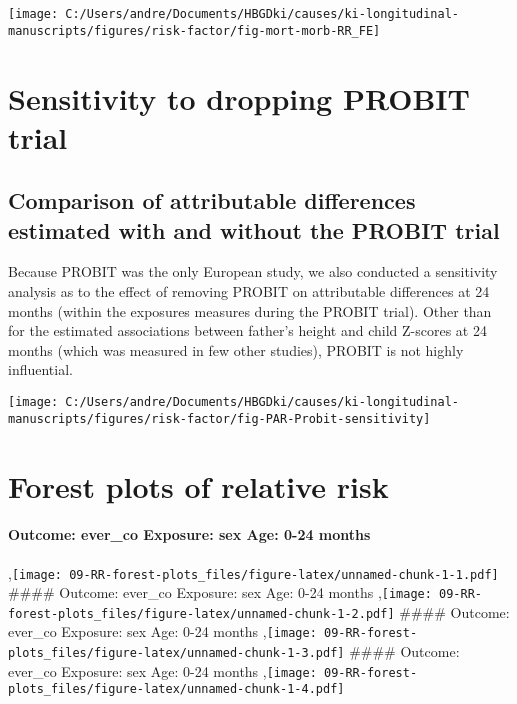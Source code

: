 \documentclass[
  9pt,
]{book}
\begin{document}
\texttt{[image: C:/Users/andre/Documents/HBGDki/causes/ki-longitudinal-manuscripts/figures/risk-factor/fig-mort-morb-RR\_FE]}

\hypertarget{no-PROBIT}{%
\chapter{Sensitivity to dropping PROBIT trial}\label{no-PROBIT}}

\raggedright

\hypertarget{comparison-of-attributable-differences-estimated-with-and-without-the-probit-trial}{%
\section{Comparison of attributable differences estimated with and without the PROBIT trial}\label{comparison-of-attributable-differences-estimated-with-and-without-the-probit-trial}}

Because PROBIT was the only European study, we also conducted a sensitivity analysis as to the effect of removing PROBIT on attributable differences at 24 months (within the exposures measures during the PROBIT trial). Other than for the estimated associations between father's height and child Z-scores at 24 months (which was measured in few other studies), PROBIT is not highly influential.

\texttt{[image: C:/Users/andre/Documents/HBGDki/causes/ki-longitudinal-manuscripts/figures/risk-factor/fig-PAR-Probit-sensitivity]}

\hypertarget{RR-forest}{%
\chapter{Forest plots of relative risk}\label{RR-forest}}

\raggedright

\hypertarget{outcome-ever_co-exposure-sex-age-0-24-months}{%
\subsubsection{Outcome: ever\_co Exposure: sex Age: 0-24 months}\label{outcome-ever_co-exposure-sex-age-0-24-months}}

,\texttt{[image: 09-RR-forest-plots\_files/figure-latex/unnamed-chunk-1-1.pdf]}
\#\#\#\# Outcome: ever\_co Exposure: sex Age: 0-24 months
,\texttt{[image: 09-RR-forest-plots\_files/figure-latex/unnamed-chunk-1-2.pdf]}
\#\#\#\# Outcome: ever\_co Exposure: sex Age: 0-24 months
,\texttt{[image: 09-RR-forest-plots\_files/figure-latex/unnamed-chunk-1-3.pdf]}
\#\#\#\# Outcome: ever\_co Exposure: sex Age: 0-24 months
,\texttt{[image: 09-RR-forest-plots\_files/figure-latex/unnamed-chunk-1-4.pdf]}
\end{document}
